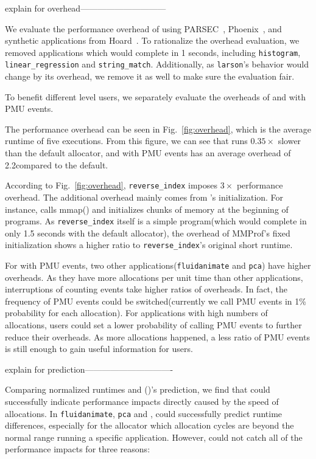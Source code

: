 explain for overhead------------------------------

We evaluate the performance overhead of \MP{} using PARSEC~\cite{parsec},  Phoenix~\cite{phoenix}, and synthetic applications from Hoard~\cite{Hoard}. To rationalize the overhead evaluation, we removed applications which would complete in 1 seconds, including \texttt{histogram}, \texttt{linear_regression} and \texttt{string_match}. Additionally, as \texttt{larson}'s behavior would change by its overhead, we remove it as well to make sure the evaluation fair. 

To benefit different level users, we separately evaluate the overheads of \MP{} and \MP{} with PMU events.

The performance overhead can be seen in Fig.~\ref{fig:overhead}, which is the average runtime of five executions. From this figure, we can see that \MP{} runs $0.35\times$ slower than the default allocator, and \MP{} with PMU events has an average overhead of 2.2\times compared to the default. 

According to Fig.~\ref{fig:overhead}, \texttt{reverse_index} imposes $3\times$ performance overhead. The additional overhead mainly comes from \MP{}'s initialization. For instance, \MP{} calls mmap() and initializes chunks of memory at the beginning of programs. As \texttt{reverse_index} itself is a simple program(which would complete in only 1.5 seconds with the default allocator), the overhead of MMProf's fixed initialization shows a higher ratio to \texttt{reverse_index}'s original short runtime.

For \MP{} with PMU events, two other applications(\texttt{fluidanimate} and \texttt{pca}) have higher overheads. As they have more allocations per unit time than other applications, interruptions of counting events take higher ratios of overheads. In fact, the frequency of PMU events could be switched(currently we call PMU events in 1\% probability for each allocation). For applications with high numbers of allocations, users could set a lower probability of calling PMU events to further reduce their overheads. As more allocations happened, a less ratio of PMU events is still enough to gain useful information for users.

explain for prediction-------------------------------

Comparing normalized runtimes and \MP()'s prediction, we find that \MP{} could successfully indicate performance impacts directly caused by the speed of allocations. In \texttt{fluidanimate}, \texttt{pca} and , \MP{} could successfully predict runtime differences, especially for the allocator which allocation cycles are beyond the normal range running a specific application. However, \MP{} could not catch all of the performance impacts for three reasons:


